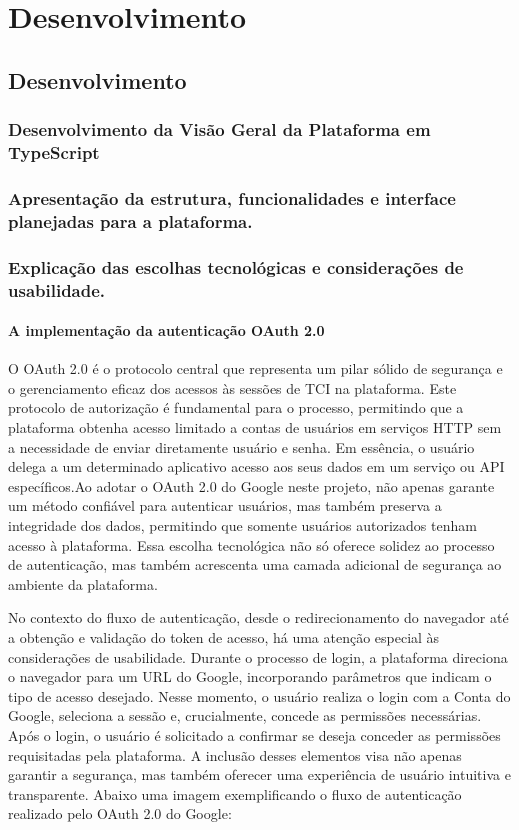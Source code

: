 \part{Desenvolvimento}
\chapter{Desenvolvimento}

\section{Desenvolvimento da Visão Geral da Plataforma em TypeScript}
\section{Apresentação da estrutura, funcionalidades e interface planejadas para a plataforma.}
\section{Explicação das escolhas tecnológicas e considerações de usabilidade.}
\subsection{A implementação da autenticação OAuth 2.0}
O OAuth 2.0 é o protocolo central que representa um pilar sólido de segurança e o gerenciamento eficaz dos acessos às sessões de TCI na plataforma. Este protocolo de autorização é fundamental para o processo, permitindo que a plataforma obtenha acesso limitado a contas de usuários em serviços HTTP sem a necessidade de enviar diretamente usuário e senha. Em essência, o usuário delega a um determinado aplicativo acesso aos seus dados em um serviço ou API específicos.\cite{OAUTH}Ao adotar o OAuth 2.0 do Google neste projeto, não apenas garante um método confiável para autenticar usuários, mas também preserva a integridade dos dados, permitindo que somente usuários autorizados tenham acesso à plataforma. Essa escolha tecnológica não só oferece solidez ao processo de autenticação, mas também acrescenta uma camada adicional de segurança ao ambiente da plataforma.

No contexto do fluxo de autenticação, desde o redirecionamento do navegador até a obtenção e validação do token de acesso, há uma atenção especial às considerações de usabilidade. Durante o processo de login, a plataforma direciona o navegador para um URL do Google, incorporando parâmetros que indicam o tipo de acesso desejado. Nesse momento, o usuário realiza o login com a Conta do Google, seleciona a sessão e, crucialmente, concede as permissões necessárias. Após o login, o usuário é solicitado a confirmar se deseja conceder as permissões requisitadas pela plataforma. A inclusão desses elementos visa não apenas garantir a segurança, mas também oferecer uma experiência de usuário intuitiva e transparente. Abaixo uma imagem exemplificando o fluxo de autenticação realizado pelo OAuth 2.0 do Google\cite{OAUTHACESS}:

